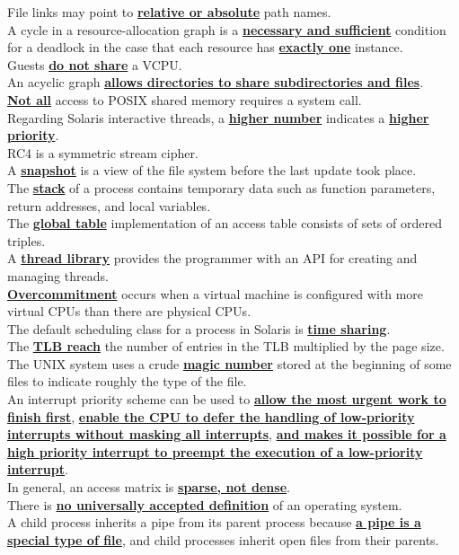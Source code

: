 \documentclass[10pt]{article}
\newcommand{\qw}[1]{\textbf{\ul{#1}}}
\begin{document}
File links may point to \qw{relative or absolute} path names.\\[2mm]
A cycle in a resource-allocation graph is a \qw{necessary and sufficient} condition for a deadlock in the case that each resource has \qw{exactly one} instance.\\[2mm]
Guests \qw{do not share} a VCPU.\\[2mm]
An acyclic graph \qw{allows directories to share subdirectories and files}.\\[2mm]
\qw{Not all} access to POSIX shared memory requires a system call.\\[2mm]
Regarding Solaris interactive threads, a \qw{higher number} indicates a \qw{higher priority}.\\[2mm]
RC4 is a symmetric stream cipher.\\[2mm]
A \qw{snapshot} is a view of the file system before the last update took place.\\[2mm]
The \qw{stack} of a process contains temporary data such as function parameters, return addresses, and local variables.\\[2mm]
The \qw{global table} implementation of an access table consists of sets of ordered triples.\\[2mm]
A \qw{thread library} provides the programmer with an API for creating and managing threads.\\[2mm]
\qw{Overcommitment} occurs when a virtual machine is configured with more virtual CPUs than there are physical CPUs.\\[2mm]
The default scheduling class for a process in Solaris is \qw{time sharing}.\\[2mm]
The \qw{TLB reach} the number of entries in the TLB multiplied by the page size.\\[2mm]
The UNIX system uses a crude \qw{magic number} stored at the beginning of some files to indicate roughly the type of the file.\\[2mm]
An interrupt priority scheme can be used to \qw{allow the most urgent work to finish first}, \qw{enable the CPU to defer the handling of low-priority interrupts without masking all interrupts}, \qw{and makes it possible for a high priority interrupt to preempt the execution of a low-priority interrupt}.\\[2mm]
In general, an access matrix is \qw{sparse, not dense}.\\[2mm]
There is \qw{no universally accepted definition} of an operating system.\\[2mm]
A child process inherits a pipe from its parent process because \qw{a pipe is a special type of file}, and child processes inherit open files from their parents.\\[2mm]
\end{document}
